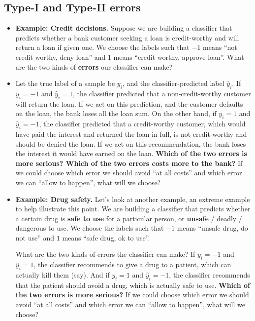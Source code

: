     \subsection{Type-I and Type-II errors}
    \begin{itemize}
      \item {\bf Example: Credit decisions.}
       Suppose we are building a classifier that predicts whether a bank customer
	seeking a loan is
	credit-worthy and will return a loan if given one.  
	We choose the labels such that $-1$ means
	``not credit worthy, deny loan'' and $1$ means  ``credit worthy, approve
	loan''. What are the
	two kinds of {\bf errors} our classifier can make? 

      \item  Let the true label of a sample be $y_i$, and the classifier-predicted label
	 $\hat{y}_i$. If $y_i=-1$ and $\hat{y}_i=1$, the classifier predicted that a
	 non-credit-worthy customer will return the loan. If we act on this
	 prediction, and the customer defaults on the loan, the bank loses all
	 the loan sum. On the other hand, if $y_i=1$ and $\hat{y}_i=-1$, the
	 classifier predicted that a credit-worthy customer, which would have
	 paid the interest and returned the loan in full, is not credit-worthy
	 and should be denied the loan. If we act on this recommendation, the
	 bank loses the interest it would have earned on the loan. {\bf Which of
	 the two errors is more serious? Which of the two errors costs more to
       the bank?} If we could choose which error we should avoid ``at all
       costs'' and which error we can ``allow to happen'', what will we choose?

     \item {\bf Example: Drug safety.} Let's look at another example, an extreme
	 example to help illustrate this point. We are building a classifier
	 that predicts whether a certain drug is {\bf safe to use} for a
	 particular person, or {\bf unsafe} / deadly / dangerous to use.
	We choose the labels such that $-1$ means
	``unsafe drug, do not use'' and $1$ means  ``safe drug, ok to use''. 

	What are the two kinds of errors the classifier can make? 
	If $y_i=-1$ and $\hat{y}_i=1$, the classifier recommends to give a drug
	to a patient, which can actually kill them (say). 
	And if $y_i=1$ and $\hat{y}_i=-1$, the classifier recommends that the
	patient should avoid a
	drug, which is actually safe to use. 
	{\bf Which of the two errors is more serious?}
	If we could choose which error we should avoid ``at all
       costs'' and which error we can ``allow to happen'', what will we choose?


\end{itemize}
